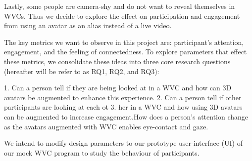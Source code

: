 Lastly, some people are camera-shy and do not want to reveal themselves in WVCs. Thus we decide to explore the effect on participation and engagement from using an avatar as an alias instead of  a live video.

The key metrics we want to observe in this project are: participant’s attention, engagement, and the feeling of connectedness. To explore parameters that effect these metrics, we consolidate these ideas into three core research questions (hereafter will be refer to as RQ1, RQ2, and RQ3):

1. Can a person tell if they are being looked at in a WVC and how can 3D avatars be augmented to enhance this experience.
2. Can a person tell if other participants are looking at each ot
3. her in a WVC and how using 3D avatars can be augmented to increase engagement.How does a person’s attention change as the avatars augmented with WVC enables eye-contact and gaze.

We intend to modify design parameters to our prototype user-interface (UI) of our mock WVC program to study the behaviour of participants.
